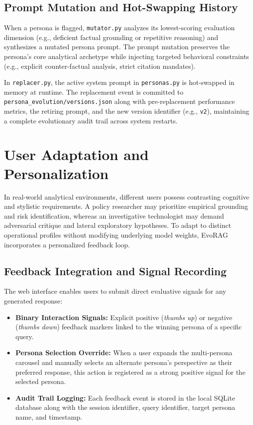 \subsection{Prompt Mutation and Hot-Swapping History}
When a persona is flagged, \texttt{mutator.py} analyzes its lowest-scoring evaluation dimension (e.g., deficient factual grounding or repetitive reasoning) and synthesizes a mutated persona prompt. The prompt mutation preserves the persona's core analytical archetype while injecting targeted behavioral constraints (e.g., explicit counter-factual analysis, strict citation mandates).

In \texttt{replacer.py}, the active system prompt in \texttt{personas.py} is hot-swapped in memory at runtime. The replacement event is committed to \texttt{persona\_evolution/versions.json} along with pre-replacement performance metrics, the retiring prompt, and the new version identifier (e.g., \texttt{v2}), maintaining a complete evolutionary audit trail across system restarts.

\section{User Adaptation and Personalization}
\label{sec:user_adaptation}

In real-world analytical environments, different users possess contrasting cognitive and stylistic requirements. A policy researcher may prioritize empirical grounding and risk identification, whereas an investigative technologist may demand adversarial critique and lateral exploratory hypotheses. To adapt to distinct operational profiles without modifying underlying model weights, EvoRAG incorporates a personalized feedback loop.

\subsection{Feedback Integration and Signal Recording}
The web interface enables users to submit direct evaluative signals for any generated response:
\begin{itemize}
    \item \textbf{Binary Interaction Signals:} Explicit positive (\emph{thumbs up}) or negative (\emph{thumbs down}) feedback markers linked to the winning persona of a specific query.
    \item \textbf{Persona Selection Override:} When a user expands the multi-persona carousel and manually selects an alternate persona's perspective as their preferred response, this action is registered as a strong positive signal for the selected persona.
    \item \textbf{Audit Trail Logging:} Each feedback event is stored in the local SQLite database along with the session identifier, query identifier, target persona name, and timestamp.
\end{itemize}

